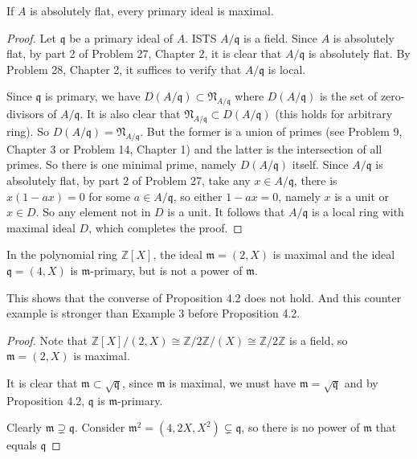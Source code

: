 \documentclass{solution}
\begin{document}
\begin{problem}
    If $A$ is absolutely flat, every primary ideal is maximal.
\end{problem}

\begin{proof}
    Let $\mathfrak{q}$ be a primary ideal of $A$. ISTS $A / \mathfrak{q}$ is a field. Since $A$ is absolutely flat, by part 2 of Problem 27, Chapter 2, it is clear that $A / \mathfrak{q}$ is absolutely flat. By Problem 28, Chapter 2, it suffices to verify that $A / \mathfrak{q}$ is local.

    Since $\mathfrak{q}$ is primary, we have $D(A / \mathfrak{q}) \subset \mathfrak{N}_{A / \mathfrak{q}}$ where $D(A / \mathfrak{q})$ is the set of zero-divisors of $A / \mathfrak{q}$. It is also clear that $\mathfrak{N}_{A / \mathfrak{q}} \subset D(A / \mathfrak{q})$ (this holds for arbitrary ring). So $D(A / \mathfrak{q}) = \mathfrak{N}_{A / \mathfrak{q}}$. But the former is a union of primes (see Problem 9, Chapter 3 or Problem 14, Chapter 1) and the latter is the intersection of all primes. So there is one minimal prime, namely $D(A / \mathfrak{q})$ itself. Since $A / \mathfrak{q}$ is absolutely flat, by part 2 of Problem 27, take any $x \in A / \mathfrak{q}$, there is $x(1 - ax) = 0$ for some $a \in A / \mathfrak{q}$, so either $1 - ax = 0$, namely $x$ is a unit or $x \in D$. So any element not in $D$ is a unit. It follows that $A / \mathfrak{q}$ is a local ring with maximal ideal $D$, which completes the proof.
\end{proof}

\begin{problem}
    In the polynomial ring $\mathbb{Z}[X]$, the ideal $\mathfrak{m} = (2, X)$ is maximal and the ideal $\mathfrak{q} = (4, X)$ is $\mathfrak{m}$-primary, but is not a power of $\mathfrak{m}$.
\end{problem}

{\color{red} This shows that the converse of Proposition 4.2 does not hold. And this counter example is stronger than Example 3 before Proposition 4.2.}

\begin{proof}
    Note that $\mathbb{Z}[X] / (2, X) \cong \mathbb{Z}/2 \mathbb{Z} / (X) \cong \mathbb{Z} / 2 \mathbb{Z}$ is a field, so $\mathfrak{m} = (2, X)$ is maximal.

    It is clear that $\mathfrak{m} \subset \sqrt{\mathfrak{q}}$, since $\mathfrak{m}$ is maximal, we must have $\mathfrak{m} = \sqrt{\mathfrak{q}}$ and by Proposition 4.2, $\mathfrak{q}$ is $\mathfrak{m}$-primary.

    Clearly $\mathfrak{m} \supsetneq \mathfrak{q}$. Consider $\mathfrak{m}^2 = (4, 2X, X^2) \subsetneq \mathfrak{q}$, so there is no power of $\mathfrak{m}$ that equals $\mathfrak{q}$
\end{proof}
\end{document}
